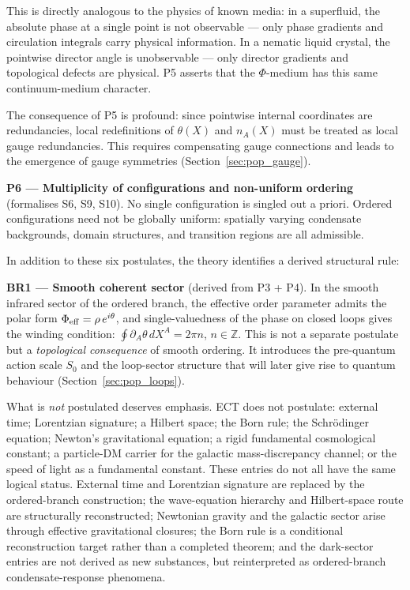 \documentclass[11pt,a4paper]{article}
\begin{document}
This is directly analogous to the physics of known media: in a superfluid, the absolute phase at a single point is not observable --- only phase gradients and circulation integrals carry physical information. In a nematic liquid crystal, the pointwise director angle is unobservable --- only director gradients and topological defects are physical. P5 asserts that the $\Phi$-medium has this same continuum-medium character.

The consequence of P5 is profound: since pointwise internal coordinates are redundancies, local redefinitions of $\theta(X)$ and $n_A(X)$ must be treated as local gauge redundancies. This requires compensating gauge connections and leads to the emergence of gauge symmetries (Section~\ref{sec:pop_gauge}).

\textbf{P6 --- Multiplicity of configurations and non-uniform ordering} (formalises S6, S9, S10).
No single configuration is singled out a priori. Ordered configurations need not be globally uniform: spatially varying condensate backgrounds, domain structures, and transition regions are all admissible.

In addition to these six postulates, the theory identifies a derived structural rule:

\textbf{BR1 --- Smooth coherent sector} (derived from P3 + P4).
In the smooth infrared sector of the ordered branch, the effective order parameter admits the polar form $\Phi_{\rm eff} = \rho\,e^{i\theta}$, and single-valuedness of the phase on closed loops gives the winding condition: $\oint \partial_A\theta\,dX^A = 2\pi n$, $n \in \mathbb{Z}$. This is not a separate postulate but a \emph{topological consequence} of smooth ordering. It introduces the pre-quantum action scale $S_0$ and the loop-sector structure that will later give rise to quantum behaviour (Section~\ref{sec:pop_loops}).

What is \emph{not} postulated deserves emphasis. ECT does not postulate: external time; Lorentzian signature; a Hilbert space; the Born rule; the Schr\"odinger equation; Newton's gravitational equation; a rigid fundamental cosmological constant; a particle-DM carrier for the galactic mass-discrepancy channel; or the speed of light as a fundamental constant. These entries do not all have the same logical status. External time and Lorentzian signature are replaced by the ordered-branch construction; the wave-equation hierarchy and Hilbert-space route are structurally reconstructed; Newtonian gravity and the galactic sector arise through effective gravitational closures; the Born rule is a conditional reconstruction target rather than a completed theorem; and the dark-sector entries are not derived as new substances, but reinterpreted as ordered-branch condensate-response phenomena.
\end{document}
